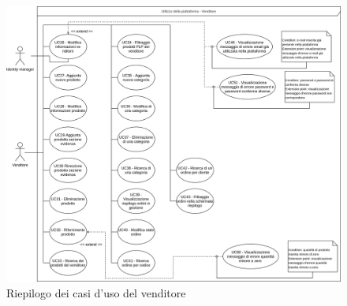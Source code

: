 \begin{figure}[H]
    \centering
    \includegraphics[width=\textwidth]{Immagini/DiagrammiUC/UsoPiattaformaVenditore.png}
    \caption{Riepilogo dei casi d'uso del venditore}
    \label{fig:uso-piattaforma-Venditore}
\end{figure}
